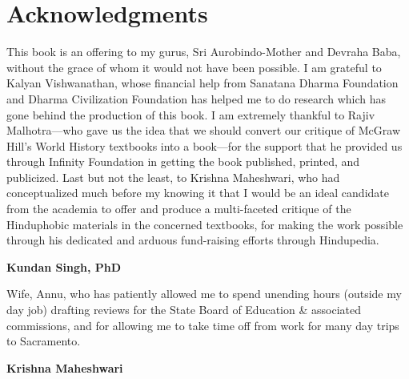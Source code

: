 \chapter*{Acknowledgments}

This book is an offering to my gurus, Sri Aurobindo-Mother and Devraha Baba, without the grace of whom it would not have been possible. I am grateful to Kalyan Vishwanathan, whose financial help from Sanatana Dharma Foundation and Dharma Civilization Foundation has helped me to do research which has gone behind the production of this book. I am extremely thankful to Rajiv Malhotra—who gave us the idea that we should convert our critique of McGraw Hill’s World History textbooks into a book—for the support that he provided us through Infinity Foundation in getting the book published, printed, and publicized. Last but not the least, to Krishna Maheshwari, who had conceptualized much before my knowing it that I would be an ideal candidate from the academia to offer and produce a multi-faceted critique of the Hinduphobic materials in the concerned textbooks, for making the work possible through his dedicated and arduous fund-raising efforts through Hindupedia.

\begin{flushright}
\textbf{Kundan Singh, PhD}
\end{flushright}


Wife, Annu, who has patiently allowed me to spend unending hours (outside my day job) drafting reviews for the State Board of Education \& associated commissions, and for allowing me to take time off from work for many day trips to Sacramento.

\begin{flushright}
\textbf{Krishna Maheshwari}
\end{flushright}
